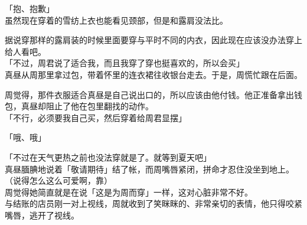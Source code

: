 「抱、抱歉」\\

虽然现在穿着的雪纺上衣也能看见颈部，但是和露肩没法比。

据说穿那样的露肩装的时候里面要穿与平时不同的内衣，因此现在应该没办法穿上给人看吧。\\

「不过，周君说了适合我，而且我穿了穿也挺喜欢的，所以会买」\\

真昼从周那里拿过包，带着怀里的连衣裙往收银台走去。于是，周慌忙跟在后面。

周觉得，那件衣服适合真昼是自己说出口的，所以应该由他付钱。他正准备拿出钱包，真昼却阻止了他在包里翻找的动作。\\

「不行，必须要我自己买，然后穿着给周君显摆」

「哦、哦」

「不过在天气更热之前也没法穿就是了。就等到夏天吧」\\

真昼腼腆地说着「敬请期待」结了帐，而周嘴唇紧闭，拼命才忍住没坐到地上。\\

（说得怎么这么可爱啊，靠）\\

周觉得她简直就是在说「这是为周而穿」一样，这对心脏非常不好。\\

与结账的店员刚一对上视线，周就收到了笑眯眯的、非常亲切的表情，他只得咬紧嘴唇，逃开了视线。

